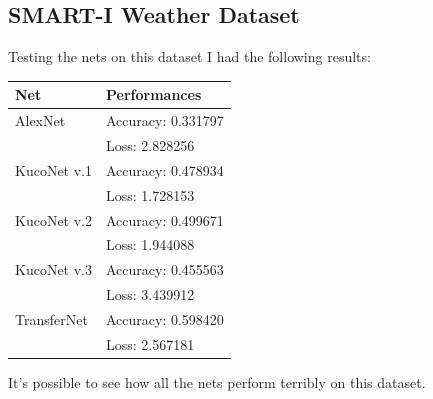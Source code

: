 \documentclass[11pt]{article}
\begin{document}
\subsection{SMART-I Weather Dataset}
Testing the nets on this dataset I had the following results:
\begin{table}[H]
	\begin{center}
		\begin{tabular}{|p{}|p{}|}
			\hline
			\textbf{Net} & \textbf{Performances} \\
			\hline
			AlexNet & Accuracy: 0.331797 \\
			\cline{2-2}
					& Loss: 2.828256 \\
			\hline
			KucoNet v.1 & Accuracy: 0.478934 \\
			\cline{2-2}
						& Loss: 1.728153 \\
			\hline
			KucoNet v.2 & Accuracy: 0.499671 \\
			\cline{2-2}
						& Loss: 1.944088 \\
			\hline
			KucoNet v.3 & Accuracy: 0.455563 \\
			\cline{2-2}
						& Loss: 3.439912 \\
			\hline
			TransferNet & Accuracy: 0.598420 \\
			\cline{2-2}
						& Loss: 2.567181 \\
			\hline
		\end{tabular}
	\end{center}
\end{table}
It's possible to see how all the nets perform terribly on this dataset.
\end{document}
